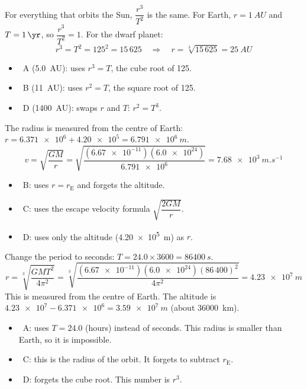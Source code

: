 \begin{practiceanswers}
\begin{practiceans}
  For everything that orbits the Sun, $\dfrac{r^3}{T^2}$ is the same. For Earth, $r = \qty{1}{AU}$ and
  $T = \qty{1}{\yr}$, so $\dfrac{r^3}{T^2} = 1$. For the dwarf planet:
  \[ r^3 = T^2 = 125^2 = 15\,625 \quad\Rightarrow\quad r = \sqrt[3]{15\,625} = \qty{25}{AU} \]
  \begin{itemize}
    \item \xmark\ A (\qty{5.0}{AU}): uses $r^3 = T$, the cube root of 125.
    \item \xmark\ B (\qty{11}{AU}): uses $r^2 = T$, the square root of 125.
    \item \xmark\ D (\qty{1400}{AU}): swaps $r$ and $T$: $r^2 = T^3$.
  \end{itemize}
\end{practiceans}

\begin{practiceans}
  The radius is measured from the centre of Earth:
  $r = \num{6.371e6} + \num{4.20e5} = \qty{6.791e6}{m}$.
  \[ v = \sqrt{\frac{GM}{r}} = \sqrt{\frac{(\num{6.67e-11})(\num{6.0e24})}{\num{6.791e6}}}
       = \qty{7.68e3}{m.s^{-1}} \]
  \begin{itemize}
    \item \xmark\ B: uses $r = r_\mathrm{E}$ and forgets the altitude.
    \item \xmark\ C: uses the escape velocity formula $\sqrt{\dfrac{2GM}{r}}$.
    \item \xmark\ D: uses only the altitude (\qty{4.20e5}{m}) as $r$.
  \end{itemize}
\end{practiceans}

\begin{practiceans}
  Change the period to seconds: $T = 24.0 \times 3600 = \qty{86400}{s}$.
  \[ r = \sqrt[3]{\frac{GMT^2}{4\pi^2}}
       = \sqrt[3]{\frac{(\num{6.67e-11})(\num{6.0e24})(86\,400)^2}{4\pi^2}}
       = \qty{4.23e7}{m} \]
  This is measured from the centre of Earth. The altitude is
  $\num{4.23e7} - \num{6.371e6} = \qty{3.59e7}{m}$ (about \qty{36000}{km}).
  \begin{itemize}
    \item \xmark\ A: uses $T = 24.0$ (hours) instead of seconds. This radius is smaller than
          Earth, so it is impossible.
    \item \xmark\ C: this is the radius of the orbit. It forgets to subtract $r_\mathrm{E}$.
    \item \xmark\ D: forgets the cube root. This number is $r^3$.
  \end{itemize}
\end{practiceans}


\end{practiceanswers}

